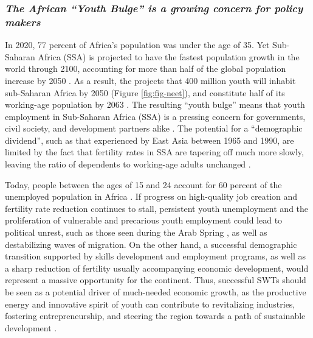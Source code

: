 \documentclass[
  a4paper, twoside, 12pt]{book}
\begin{document}
\hypertarget{the-african-youth-bulge-is-a-growing-concern-for-policy-makers}{%
\subsubsection*{\texorpdfstring{\emph{The African ``Youth Bulge'' is a growing concern for policy makers}}{The African ``Youth Bulge'' is a growing concern for policy makers}}\label{the-african-youth-bulge-is-a-growing-concern-for-policy-makers}}

In 2020, 77 percent of Africa's population was under the age of 35. Yet Sub-Saharan Africa (SSA) is projected to have the fastest population growth in the world through 2100, accounting for more than half of the global population increase by 2050 \autocite{un2022}. As a result, the \textcite{unitednations2022} projects that 400 million youth will inhabit sub-Saharan Africa by 2050 (Figure \ref{fig:fig-neet}), and constitute half of its working-age population by 2063 \autocite{africandevelopmentbank2022}. The resulting ``youth bulge'' means that youth employment in Sub-Saharan Africa (SSA) is a pressing concern for governments, civil society, and development partners alike \autocite{ilo2022a}. The potential for a ``demographic dividend'', such as that experienced by East Asia between 1965 and 1990, are limited by the fact that fertility rates in SSA are tapering off much more slowly, leaving the ratio of dependents to working-age adults unchanged \autocite{eastwood2011,filmer2014}.

Today, people between the ages of 15 and 24 account for 60 percent of the unemployed population in Africa \autocite{bonnet2018}. If progress on high-quality job creation and fertility rate reduction continues to stall, persistent youth unemployment and the proliferation of vulnerable and precarious youth employment could lead to political unrest, such as those seen during the Arab Spring \autocite{urdal2006}, as well as destabilizing waves of migration. On the other hand, a successful demographic transition supported by skills development and employment programs, as well as a sharp reduction of fertility usually accompanying economic development, would represent a massive opportunity for the continent. Thus, successful SWTs should be seen as a potential driver of much-needed economic growth, as the productive energy and innovative spirit of youth can contribute to revitalizing industries, fostering entrepreneurship, and steering the region towards a path of sustainable development \autocite{filmer2014,worldbank2019}.
\end{document}
